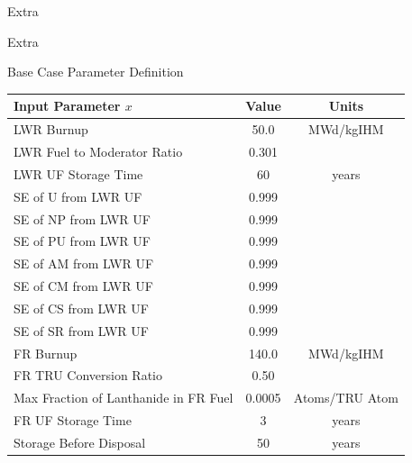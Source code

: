 \documentclass[pdf, autumn, slideColor, nocolorBG]{prosper}
\begin{document}
\begin{slide}{Extra}
\vspace{3.5cm}
\begin{center}
\Large
Extra
\end{center}
\end{slide}




\begin{slide}{Base Case Parameter Definition}
\tiny
\begin{center}
\begin{tabular}{|l||c|c|}
\hline
\textbf{Input Parameter $x$} & \textbf{Value} & \textbf{Units} \\
\hline
LWR Burnup & 50.0 & MWd/kgIHM \\
\hline
LWR Fuel to Moderator Ratio & 0.301 & \\
\hline
LWR UF Storage Time & 60 & years \\
\hline
SE of U from LWR UF & 0.999 & \\
\hline
SE of NP from LWR UF & 0.999 & \\
\hline
SE of PU from LWR UF & 0.999 & \\
\hline
SE of AM from LWR UF & 0.999 & \\
\hline
SE of CM from LWR UF & 0.999 & \\
\hline
SE of CS from LWR UF & 0.999 & \\
\hline
SE of SR from LWR UF & 0.999 & \\
\hline
FR Burnup & 140.0 & MWd/kgIHM \\
\hline
FR TRU Conversion Ratio & 0.50 & \\
\hline
Max Fraction of Lanthanide in FR Fuel & 0.0005 & Atoms/TRU Atom \\
\hline
FR UF Storage Time & 3 & years \\
\hline
Storage Before Disposal & 50 & years \\
\hline
\end{tabular}
\end{center}
\end{slide}
\end{document}
